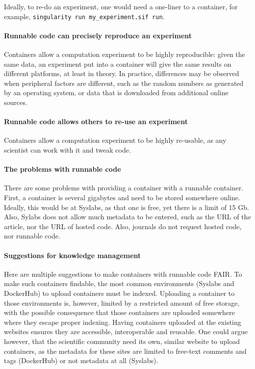 Ideally, to re-do an experiment, one would need a one-liner to a container,
for example, \verb|singularity run my_experiment.sif run|.

\paragraph{Runnable code can precisely reproduce an experiment}

Containers allow a computation experiment to be highly reproducible:
given the same data, an experiment put into a container will give
the same results on different platforms, at least in theory.
In practice, differences may be observed when peripheral factors
are different, such as the random numbers as generated by an operating
system, or data that is downloaded from additional online sources.

\paragraph{Runnable code allows others to re-use an experiment}

Containers allow a computation experiment to be highly re-usable,
as any scientist can work with it and tweak code.

\paragraph{The problems with runnable code}

There are some problems with providing a container with a runnable container.
First, a container is several gigabytes and need to be stored somewhere
online. Ideally, this would be at Syslabs, as that one is free, yet
there is a limit of 15 Gb. Also, Sylabs does not allow much metadata to
be entered, such as the URL of the article, nor the URL of hosted code.
Also, journals do not request hosted code, nor runnable code.

\paragraph{Suggestions for knowledge management}

Here are multiple suggestions to make containers with runnable code FAIR.
To make such containers findable, the most common 
environments (Syslabs and DockerHub) to upload containers must be indexed.
Uploading a container to those environments is, however, limited by
a restricted amount of free storage, with the possible consequence that
those containers are uploaded somewhere where they escape proper indexing.
Having containers uploaded at the existing websites ensures they are
accessible, interoperable and reusable.
One could argue however, that the scientific community need its own,
similar website to upload containers, as the metadata for these
sites are limited to free-text comments and tags (DockerHub)
or not metadata at all (Syslabs).

